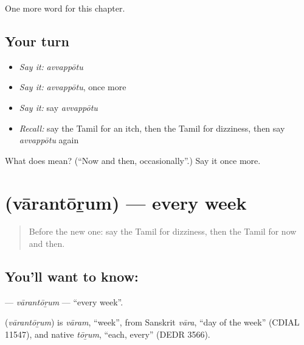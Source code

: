 \begin{grammarlens}[title={What you've built}]
One more word for this chapter.
\end{grammarlens}

\subsection*{Your turn}
\begin{itemize}
\raggedright
  \item \emph{Say it:} \emph{avvappōtu}
  \item \emph{Say it:} \emph{avvappōtu}, once more
  \item \emph{Say it:} say \emph{avvappōtu}
  \item \emph{Recall:} say the Tamil for an itch, then the Tamil for dizziness, then say \emph{avvappōtu} again
\end{itemize}

\begin{tcolorbox}[breakable,colback=teal!4,colframe=teal!35!black,title={Before you move on}]
What does  mean? (\textquotedblleft{}Now and then, occasionally\textquotedblright{}.) Say it once more.
\end{tcolorbox}
\section[\texorpdfstring{\ta{வாரந்தோறும்} (vārantōṟum)}{வாரந்தோறும் (vārantōṟum)}]{ (vārantōṟum) — every week}

\label{lesson:TA-C262-varantorum}



\begin{quote}
Before the new one: say the Tamil for dizziness, then the Tamil for now and then.
\end{quote}

\subsection*{You'll want to know: }
\textbf{} — \emph{vārantōṟum} — \textquotedblleft{}every week\textquotedblright{}.

\begin{cousinweb}
\textbf{} (\emph{vārantōṟum}) is \emph{vāram}, \textquotedblleft{}week\textquotedblright{}, from Sanskrit \emph{vāra}, \textquotedblleft{}day of the week\textquotedblright{} (CDIAL 11547), and native \emph{tōṟum}, \textquotedblleft{}each, every\textquotedblright{} (DEDR 3566).
\end{cousinweb}


